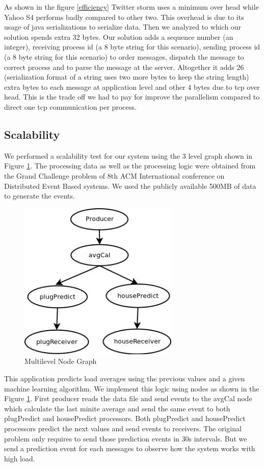 As shown in the figure \ref{efficiency} Twitter storm\cite{twitterStorm} uses a minimum over head while Yahoo S4\cite{neumeyer2010s4} performs badly compared to other two. This overhead is due to its usage of  java serializations to serialize data. Then we analyzed to which our solution spends extra 32 bytes. Our solution adds a sequence number (an integer), receiving process id (a 8 byte string for this scenario), sending process id (a 8 byte string for this scenario) to order messages, dispatch the message to correct process and to parse the message at the server. Altogether it adds 26 (serialization format of a string uses two more bytes to keep the string length) extra bytes to each message at application level and other 4 bytes due to tcp over head. This is the trade off we had to pay for improve the parallelism compared to direct one tcp communication per process. 

\subsection{Scalability}
We performed a scalability test for our system using the 3 level graph shown in Figure \ref{multigraph}. The processing data as well as the processing logic were obtained from the Grand Challenge problem of 8th ACM International conference on Distributed Event Based systems. We used the publicly available 500MB of data to generate the events. 

\begin{figure}[!t]
        \centering
        \includegraphics[width=3.0in]{multigraph.png}
        \caption{Multilevel Node Graph}
        \label{multigraph}
\end{figure}

This application predicts load averages using the previous values and a given machine learning algorithm. We implement this logic using nodes as shown in the Figure \ref{multigraph}. First producer reads the data file and send events to the avgCal node which calculate the last minite average and send the same event to both plugPredict and housePredict processors. Both plugPredict and housePredict processors predict the next values and send events to receivers. The original problem only requires to send those prediction events in 30s intervals. But we send a prediction event for each messages to observe how the system works with high load.
 
